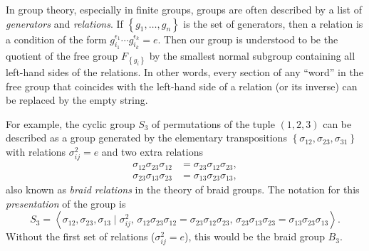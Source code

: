 \begin{rem}
In group theory, especially in finite groups, groups are often described
by a list of \emph{generators} and \emph{relations}. If $\left\{ g_{1},\ldots,g_{n}\right\} $
is the set of generators, then a relation is a condition of the form
$g_{i_{1}}^{\epsilon_{1}}\cdots g_{i_{k}}^{\epsilon_{k}}=e$. Then
our group is understood to be the quotient of the free group $F_{\left\{ g_{i}\right\} }$
by the smallest normal subgroup containing all left-hand sides of the
relations. In other words, every section of any ``word'' in the
free group that coincides with the left-hand side of a relation (or
its inverse) can be replaced by the empty string.

For example, the cyclic group $S_{3}$ of permutations of the tuple $(1,2,3) $
can be described as a group generated by the elementary transpositions
$\left\{ \sigma_{12},\sigma_{23},\sigma_{31}\right\} $ with relations
$\sigma_{ij}^{2}=e$ and two extra relations
\begin{align}
\sigma_{12}\sigma_{23}\sigma_{12} & =\sigma_{23}\sigma_{12}\sigma_{23},\nonumber \\
\sigma_{23}\sigma_{13}\sigma_{23} & =\sigma_{13}\sigma_{23}\sigma_{13},
\end{align}
also known as \emph{braid relations} in the theory of braid groups.
The notation for this \emph{presentation} of the group is
\begin{equation}
S_{3}=\left\langle \sigma_{12},\sigma_{23},\sigma_{13}\mid\sigma_{ij}^{2},\,\sigma_{12}\sigma_{23}\sigma_{12}=\sigma_{23}\sigma_{12}\sigma_{23},\,\sigma_{23}\sigma_{13}\sigma_{23}=\sigma_{13}\sigma_{23}\sigma_{13}\right\rangle .
\end{equation}
Without the first set of relations ($\sigma_{ij}^{2}=e$), this would
be the braid group $B_{3}$.
\end{rem}
%
